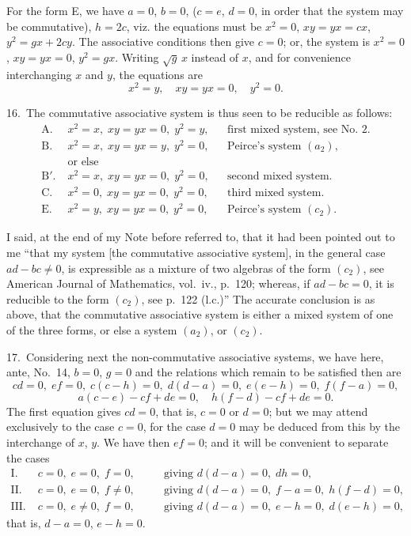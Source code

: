 \documentclass[11pt,a4paper]{book}
\begin{document}
For the form E, we have $a=0$, $b=0$, ($c=e$, $d=0$, in order that the system may be commutative), $h=2c$, viz. the equations must be $x^2=0$, $xy=yx=cx$, $y^2=gx+2cy$. The associative conditions then give $c=0$; or, the system is $x^2=0$, $xy=yx=0$, $y^2=gx$. Writing $\sqrt{g}\,x$ instead of $x$, and for convenience interchanging $x$ and $y$, the equations are
\[
x^2=y,\quad xy=yx=0,\quad y^2=0.
\]

16.~The commutative associative system is thus seen to be reducible as follows:
\begin{align*}
\text{A.}\;& x^2=x,\; xy=yx=0,\; y^2=y, && \text{first mixed system, see No.~2.}\\
\text{B.}\;& x^2=x,\; xy=yx=y,\; y^2=0, && \text{Peirce's system $(a_2)$,}\\
&\text{or else}\\
\text{B$'$.}\;& x^2=x,\; xy=yx=0,\; y^2=0, && \text{second mixed system.}\\
\text{C.}\;& x^2=0,\; xy=yx=0,\; y^2=0, && \text{third mixed system.}\\
\text{E.}\;& x^2=y,\; xy=yx=0,\; y^2=0, && \text{Peirce's system $(c_2)$.}
\end{align*}

I said, at the end of my Note before referred to, that it had been pointed out to me ``that my system [the commutative associative system], in the general case $ad-bc\neq 0$, is expressible as a mixture of two algebras of the form $(c_2)$, see American Journal of Mathematics, vol.~iv., p.~120; whereas, if $ad-bc=0$, it is reducible to the form $(c_2)$, see p.~122 (l.c.)'' The accurate conclusion is as above, that the commutative associative system is either a mixed system of one of the three forms, or else a system $(a_2)$, or $(c_2)$.

17.~Considering next the non-commutative associative systems, we have here, ante, No.~14, $b=0$, $g=0$ and the relations which remain to be satisfied then are
\[
cd=0,\; ef=0,\; c(c-h)=0,\; d(d-a)=0,\; e(e-h)=0,\; f(f-a)=0,
\]
\[
a(c-e)-cf+de=0,\quad h(f-d)-cf+de=0.
\]
The first equation gives $cd=0$, that is, $c=0$ or $d=0$; but we may attend exclusively to the case $c=0$, for the case $d=0$ may be deduced from this by the interchange of $x$, $y$. We have then $ef=0$; and it will be convenient to separate the cases
\begin{align*}
\text{I.}\;& c=0,\; e=0,\; f=0,\quad &&\text{giving } d(d-a)=0,\; dh=0,\\
\text{II.}\;& c=0,\; e=0,\; f\neq 0,\quad &&\text{giving } d(d-a)=0,\; f-a=0,\; h(f-d)=0,\\
\text{III.}\;& c=0,\; e\neq 0,\; f=0,\quad &&\text{giving } d(d-a)=0,\; e-h=0,\; d(e-h)=0,
\end{align*}
that is, $d-a=0$, $e-h=0$.
\end{document}
